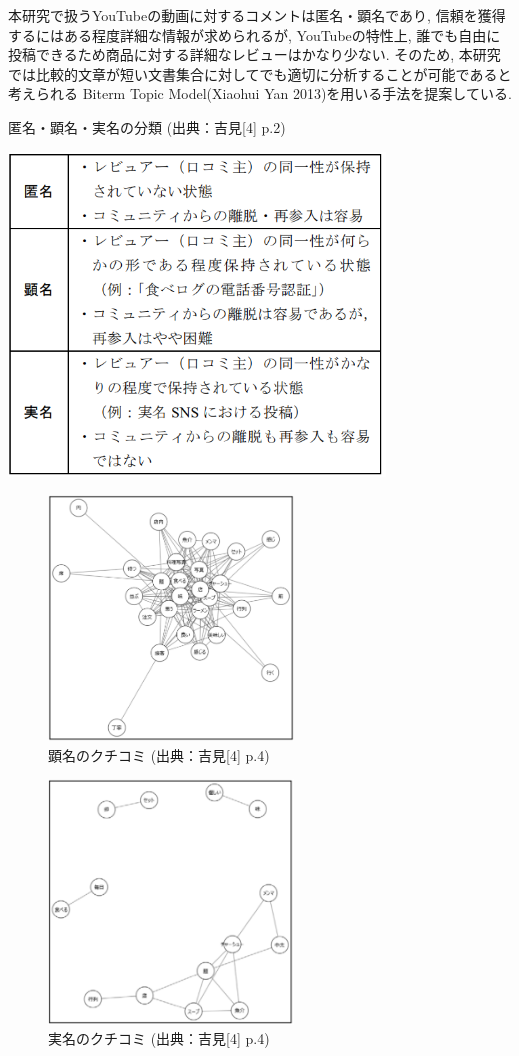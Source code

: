 \documentclass{ltjarticle}
\begin{document}
本研究で扱うYouTubeの動画に対するコメントは匿名・顕名であり, 信頼を獲得するにはある程度詳細な情報が求められるが, 
YouTubeの特性上, 誰でも自由に投稿できるため商品に対する詳細なレビューはかなり少ない. 
そのため, 本研究では比較的文章が短い文書集合に対してでも適切に分析することが可能であると考えられる
Biterm Topic Model(Xiaohui Yan 2013)を用いる手法を提案している. 
\begin{table}[h]
    \centering
    \caption{匿名・顕名・実名の分類 (出典：吉見[4] p.2)}
    \vspace{5truept}
    \includegraphics[width = 10cm]{images/関連研究4表1.png}
    \label{table:関連研究4表1}
\end{table}
\newpage
\begin{figure}[h]
    \centering
    \includegraphics[width=6.5cm]{images/顕名のクチコミ.png}
    \caption{顕名のクチコミ (出典：吉見[4] p.4)}
    \label{fig:顕名}
\end{figure}
\begin{figure}[h]
    \centering
    \includegraphics[width=6.5cm]{images/実名のクチコミ.png}
    \caption{実名のクチコミ (出典：吉見[4] p.4)}
    \label{fig:実名}
\end{figure}
\end{document}
